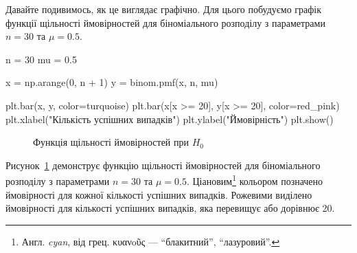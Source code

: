 \documentclass[
  letterpaper,
  10pt,
  openany]{report}
\newenvironment{Shaded}{\begin{snugshade}}{\end{snugshade}}
\newcommand{\DecValTok}[1]{\textcolor[rgb]{0.68,0.00,0.00}{#1}}
\newcommand{\FloatTok}[1]{\textcolor[rgb]{0.68,0.00,0.00}{#1}}
\newcommand{\NormalTok}[1]{\textcolor[rgb]{0.00,0.23,0.31}{#1}}
\newcommand{\OperatorTok}[1]{\textcolor[rgb]{0.37,0.37,0.37}{#1}}
\newcommand{\StringTok}[1]{\textcolor[rgb]{0.13,0.47,0.30}{#1}}
\theoremstyle{definition}
\theoremstyle{remark}
\begin{document}
Давайте подивимось, як це виглядає графічно. Для цього побудуємо графік
функції щільності ймовірностей для біноміального розподілу з параметрами
\(n = 30\) та \(\mu = 0.5\).

\begin{Shaded}
\begin{Highlighting}[]
\NormalTok{n }\OperatorTok{=} \DecValTok{30}
\NormalTok{mu }\OperatorTok{=} \FloatTok{0.5}

\NormalTok{x }\OperatorTok{=}\NormalTok{ np.arange(}\DecValTok{0}\NormalTok{, n }\OperatorTok{+} \DecValTok{1}\NormalTok{)}
\NormalTok{y }\OperatorTok{=}\NormalTok{ binom.pmf(x, n, mu)}

\NormalTok{plt.bar(x, y, color}\OperatorTok{=}\NormalTok{turquoise)}
\NormalTok{plt.bar(x[x }\OperatorTok{\textgreater{}=} \DecValTok{20}\NormalTok{], y[x }\OperatorTok{\textgreater{}=} \DecValTok{20}\NormalTok{], color}\OperatorTok{=}\NormalTok{red\_pink)}
\NormalTok{plt.xlabel(}\StringTok{"Кількість успішних випадків"}\NormalTok{)}
\NormalTok{plt.ylabel(}\StringTok{"Ймовірність"}\NormalTok{)}
\NormalTok{plt.show()}
\end{Highlighting}
\end{Shaded}

\begin{figure}[H]


\caption{\label{fig-binom-pmf}Функція щільності ймовірностей при
\(H_0\)}

\end{figure}%

Рисунок~\ref{fig-binom-pmf} демонструє функцію щільності ймовірностей
для біноміального розподілу з параметрами \(n = 30\) та \(\mu = 0.5\).
Ціановим\footnote{Англ. \emph{cyan}, від грец. κυανoῦς ---
  ``блакитний'', ``лазуровий''.} кольором позначено ймовірності для
кожної кількості успішних випадків. Рожевими виділено ймовірності для
кількості успішних випадків, яка перевищує або дорівнює 20.
\end{document}
